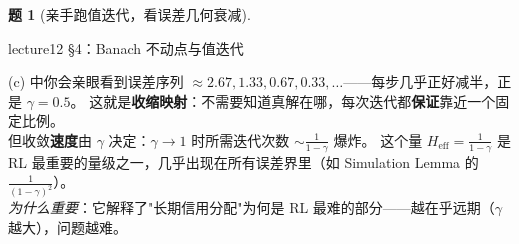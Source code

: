 \documentclass[11pt,a4paper]{article}
\theoremstyle{definition}
\newtheorem{problem}{题}
\begin{document}
\begin{problem}[亲手跑值迭代，看误差几何衰减]
\begin{topicbox}
lecture12 §4：Banach 不动点与值迭代
\end{topicbox}
\begin{takeaway}
(c) 中你会亲眼看到误差序列 $\approx 2.67, 1.33, 0.67, 0.33, \ldots$——每步几乎正好减半，正是 $\gamma = 0.5$。
这就是\textbf{收缩映射}：不需要知道真解在哪，每次迭代都\textbf{保证}靠近一个固定比例。\\
但收敛\textbf{速度}由 $\gamma$ 决定：$\gamma \to 1$ 时所需迭代次数 $\sim \frac{1}{1-\gamma}$ 爆炸。
这个量 $H_{\mathrm{eff}} = \frac{1}{1-\gamma}$ 是 RL 最重要的量级之一，几乎出现在所有误差界里（如 Simulation Lemma 的 $\frac{1}{(1-\gamma)^2}$）。\\
\textit{为什么重要}：它解释了"长期信用分配"为何是 RL 最难的部分——越在乎远期（$\gamma$ 越大），问题越难。
\end{takeaway}
\end{problem}

\medskip
\end{document}
